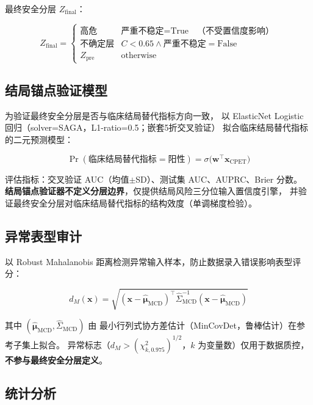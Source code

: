 \documentclass[12pt, a4paper]{ctexart}
\begin{document}
最终安全分层 $Z_{\text{final}}$：

\begin{equation}
\label{eq:final_zone}
Z_{\text{final}} =
\begin{cases}
\text{高危}       & \text{严重不稳定} = \text{True}
                   \quad \text{（不受置信度影响）} \\
\text{不确定层}   & C < 0.65 \wedge \text{严重不稳定} = \text{False} \\
Z_{\text{pre}}    & \text{otherwise}
\end{cases}
\end{equation}

\subsection{结局锚点验证模型}

为验证最终安全分层是否与临床结局替代指标方向一致，
以 ElasticNet Logistic 回归（solver=SAGA，L1-ratio=0.5；嵌套5折交叉验证）
拟合临床结局替代指标的二元预测模型：

\begin{equation}
\Pr(\text{临床结局替代指标} = \text{阳性}) = \sigma\bigl(\mathbf{w}^\top \mathbf{x}_{\text{CPET}}\bigr)
\end{equation}

评估指标：交叉验证 AUC（均值$\pm$SD）、测试集 AUC、AUPRC、Brier 分数。
\textbf{结局锚点验证器不定义分层边界}，仅提供结局风险三分位输入置信度引擎，
并验证最终安全分层对临床结局替代指标的结构效度（单调梯度检验）。

\subsection{异常表型审计}

以 Robust Mahalanobis 距离检测异常输入样本，防止数据录入错误影响表型评分：

\begin{equation}
d_M(\mathbf{x}) = \sqrt{(\mathbf{x} - \hat{\boldsymbol{\mu}}_{\text{MCD}})^\top
  \hat{\Sigma}_{\text{MCD}}^{-1} (\mathbf{x} - \hat{\boldsymbol{\mu}}_{\text{MCD}})}
\end{equation}

其中 $(\hat{\boldsymbol{\mu}}_{\text{MCD}}, \hat{\Sigma}_{\text{MCD}})$ 由
最小行列式协方差估计（MinCovDet，鲁棒估计）在参考子集上拟合\cite{Mahalanobis1936}。
异常标志（$d_M > (\chi^2_{k, 0.975})^{1/2}$，$k$ 为变量数）仅用于数据质控，
\textbf{不参与最终安全分层定义}。

\subsection{统计分析}
\end{document}
